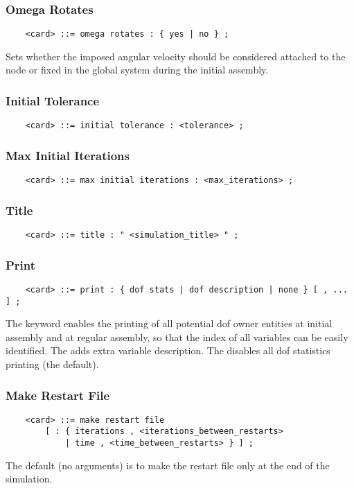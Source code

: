 \subsubsection{Omega Rotates}
\begin{verbatim}
    <card> ::= omega rotates : { yes | no } ;
\end{verbatim}
Sets whether the imposed angular velocity should be considered attached 
to the node or fixed in the global system during the initial assembly.

\subsubsection{Initial Tolerance}
\begin{verbatim}
    <card> ::= initial tolerance : <tolerance> ;
\end{verbatim}

\subsubsection{Max Initial Iterations}
\begin{verbatim}
    <card> ::= max initial iterations : <max_iterations> ;
\end{verbatim}

\subsubsection{Title}
\begin{verbatim}
    <card> ::= title : " <simulation_title> " ;
\end{verbatim}

\subsubsection{Print}
\begin{verbatim}
    <card> ::= print : { dof stats | dof description | none } [ , ... ] ;
\end{verbatim}
The  keyword enables the printing of all potential
dof owner entities at initial assembly and at regular assembly,
so that the index of all variables can be easily identified.
The  adds extra variable description.
The  disables all dof statistics printing (the default).

\subsubsection{Make Restart File}
\begin{verbatim}
    <card> ::= make restart file
        [ : { iterations , <iterations_between_restarts>
            | time , <time_between_restarts> } ] ;
\end{verbatim}
The default (no arguments) is to make the restart file only at the end of
the simulation.

